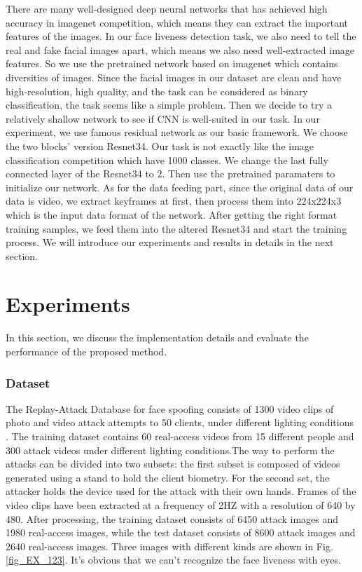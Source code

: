 \documentclass[journal]{IEEEtran}
\begin{document}
There are many well-designed deep neural networks that has achieved high accuracy in imagenet competition, which means they can extract the important features of the images. In our face liveness detection task, we also need to tell the real and fake facial images apart, which means we also need well-extracted image features. So we use the pretrained network based on imagenet which contains diversities of images. 
Since the facial images in our dataset are clean and have high-resolution, high quality, and the task can be considered as binary classification, the task seems like a simple problem. Then we decide to try a relatively shallow network to see if CNN is well-suited in our task. In our experiment, we use famous residual network as our basic framework. We choose the two blocks' version Resnet34.
Our task is not exactly like the image classification competition which have 1000 classes. We change the last fully connected layer of the Resnet34 to 2. Then use the pretrained paramaters to initialize our network. As for the data feeding part, since the original data of our data is video, we extract keyframes at first, then process them into 224x224x3 which is the input data format of the network. After getting the right format training samples, we feed them into the altered Resnet34 and start the training process. We will introduce our experiments and results in details in the next section.

\section{Experiments}

In this section, we discuss the implementation details and evaluate the performance of the proposed method.
\subsubsection*{\textbf{Dataset}}
The Replay-Attack Database for face spoofing consists of 1300 video clips of photo and video attack attempts to 50 clients, under different lighting conditions \cite{chingovska2012effectiveness}. The training dataset contains 60 real-access videos from 15 different people and 300 attack videos under different lighting conditions.The way to perform the attacks can be divided into two subsets: the first subset is composed of videos generated using a stand to hold the client biometry. For the second set, the attacker holds the device used for the attack with their own hands. Frames of the video clips have been extracted at a frequency of 2HZ with a resolution of 640 by 480. After processing, the training dataset consists of 6450 attack images and 1980 real-access images, while the test dataset consists of 8600 attack images and 2640 real-access images. Three images with different kinds are shown in Fig. \ref{fig_EX_123}. It's obvious that we can't recognize the face liveness with eyes.
\end{document}
